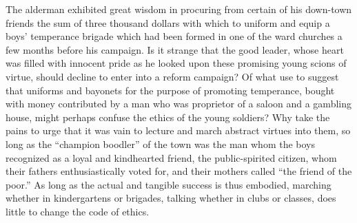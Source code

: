 \documentclass[]{article}
\begin{document}
\begin{sectionbody}
\addamsparagraph The alderman exhibited great wisdom in procuring from certain of his
down-town friends the sum of three thousand dollars with which to
uniform and equip a boys' temperance brigade which had been formed in
one of the ward churches a few months before his campaign. Is it strange
that the good leader, whose heart was filled with innocent pride as he
looked upon these promising young scions of virtue, should decline to
enter into a reform campaign? Of what use to suggest that uniforms and
bayonets for the purpose of promoting temperance, bought with money
contributed by a man who was proprietor of a saloon and a gambling
house, might perhaps confuse the ethics of the young soldiers? Why take
the pains to urge that it was vain to lecture and march abstract virtues
into them, so long as the ``champion boodler'' of the town was the man
whom the boys recognized as a loyal and kindhearted friend, the
public-spirited citizen, whom their fathers enthusiastically voted for,
and their mothers called ``the friend of the poor.'' As long as the actual
and tangible success is thus embodied, marching whether in kindergartens
or brigades, talking whether in clubs or classes, does little to change
the code of ethics.


\end{sectionbody}
\end{document}
